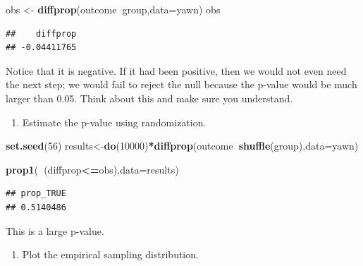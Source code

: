 \documentclass[
]{book}
\newenvironment{Shaded}{\begin{snugshade}}{\end{snugshade}}
\newcommand{\DataTypeTok}[1]{\textcolor[rgb]{0.13,0.29,0.53}{#1}}
\newcommand{\DecValTok}[1]{\textcolor[rgb]{0.00,0.00,0.81}{#1}}
\newcommand{\KeywordTok}[1]{\textcolor[rgb]{0.13,0.29,0.53}{\textbf{#1}}}
\newcommand{\NormalTok}[1]{#1}
\newcommand{\OperatorTok}[1]{\textcolor[rgb]{0.81,0.36,0.00}{\textbf{#1}}}
\newcommand{\StringTok}[1]{\textcolor[rgb]{0.31,0.60,0.02}{#1}}
\providecommand{\tightlist}{%
  \setlength{\itemsep}{0pt}\setlength{\parskip}{0pt}}
\begin{document}
\begin{Shaded}
\begin{Highlighting}[]
\NormalTok{obs <-}\StringTok{ }\KeywordTok{diffprop}\NormalTok{(outcome}\OperatorTok{~}\NormalTok{group,}\DataTypeTok{data=}\NormalTok{yawn)}
\NormalTok{obs}
\end{Highlighting}
\end{Shaded}

\begin{verbatim}
##    diffprop 
## -0.04411765
\end{verbatim}

Notice that it is negative. If it had been positive, then we would not even need the next step; we would fail to reject the null because the p-value would be much larger than 0.05. Think about this and make sure you understand.

\begin{enumerate}
\def\labelenumi{\alph{enumi}.}
\setcounter{enumi}{2}
\tightlist
\item
  Estimate the p-value using randomization.
\end{enumerate}

\begin{Shaded}
\begin{Highlighting}[]
\KeywordTok{set.seed}\NormalTok{(}\DecValTok{56}\NormalTok{)}
\NormalTok{results<-}\KeywordTok{do}\NormalTok{(}\DecValTok{10000}\NormalTok{)}\OperatorTok{*}\KeywordTok{diffprop}\NormalTok{(outcome}\OperatorTok{~}\KeywordTok{shuffle}\NormalTok{(group),}\DataTypeTok{data=}\NormalTok{yawn)}
\end{Highlighting}
\end{Shaded}

\begin{Shaded}
\begin{Highlighting}[]
\KeywordTok{prop1}\NormalTok{(}\OperatorTok{~}\NormalTok{(diffprop}\OperatorTok{<=}\NormalTok{obs),}\DataTypeTok{data=}\NormalTok{results)}
\end{Highlighting}
\end{Shaded}

\begin{verbatim}
## prop_TRUE 
## 0.5140486
\end{verbatim}

This is a large p-value.

\begin{enumerate}
\def\labelenumi{\alph{enumi}.}
\setcounter{enumi}{3}
\tightlist
\item
  Plot the empirical sampling distribution.
\end{enumerate}
\end{document}
